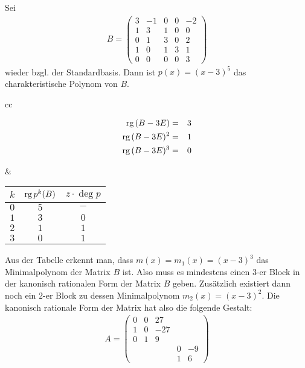     Sei
    \begin{align*}
        B =
        \begin{pmatrix}
            3 & -1 & 0 & 0 & -2\\
            1 & 3 & 1 & 0 & 0\\
            0 & 1 & 3 & 0 & 2\\
            1 & 0 & 1 & 3 & 1\\
            0 & 0 & 0 & 0 & 3
        \end{pmatrix}
    \end{align*}
    wieder bzgl. der Standardbasis.
    Dann ist $p(x) = (x-3)^5$ das charakteristische Polynom von $B$.\par \medskip
    \begin{tabular}{cc}
        \begin{minipage}{5cm}
            \begin{eqnarray*}
                \text{rg}\, (B-3E)   & = & 3\\
                \text{rg}\, (B-3E)^2 & = & 1 \\
                \text{rg}\, (B-3E)^3 & = & 0
            \end{eqnarray*}
        \end{minipage}
        &
        \begin{minipage}{5cm}
            \begin{tabular}{c|c|c}
                $k$   &   $\text{rg}\, p^k(B)$   &   $z\cdot \deg p$ \\ \hline
                $0$   &       $5$        &       $-$ \\
                $1$   &       $3$        &       $0$ \\
                $2$   &       $1$        &       $1$ \\
                $3$   &       $0$        &       $1$ \\
            \end{tabular}
        \end{minipage}
    \end{tabular} \par \medskip
    Aus der Tabelle erkennt man, dass $m(x) = m_1(x) = (x-3)^3$ das Minimalpolynom der Matrix $B$ ist.
    Also muss es mindestens einen $3$-er Block in der kanonisch rationalen Form der Matrix $B$ geben.
    Zusätzlich existiert dann noch ein $2$-er Block zu dessen Minimalpolynom $m_2(x)=(x-3)^2$. 
    Die kanonisch rationale Form der Matrix hat also die folgende Gestalt:
    \begin{align*}
        A =
        \begin{pmatrix}
            0 & 0 & 27 & & \\
            1 & 0 & -27 & & \\
            0 & 1 & 9 & & \\
            & & & 0 & -9\\
            & & & 1 & 6
        \end{pmatrix}
    \end{align*}
